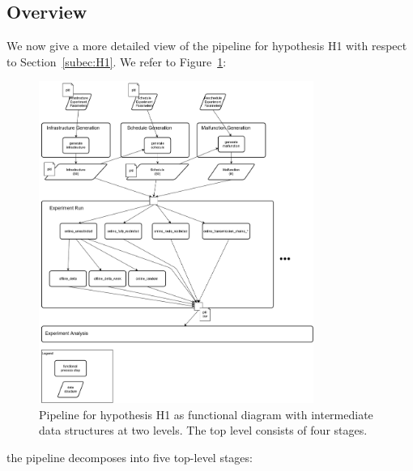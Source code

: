 \documentclass{article}
\begin{document}
\subsection{Overview}\label{subsubsec:H1overview}
We now give a more detailed view of the pipeline for hypothesis H1 with respect to Section~\ref{subec:H1}. We refer to Figure~\ref{fig:H1_overview}:
%
\begin{figure}[hbtp]
	\centering
  \includegraphics[width=0.8\textwidth]{Figures/03_pipeline/H1_overview.png}
	\caption{Pipeline for hypothesis H1 as functional diagram with intermediate data structures at two levels. The top level consists of four stages.}
	\label{fig:H1_overview}
\end{figure}
%
the pipeline decomposes into five top-level stages:
\end{document}

